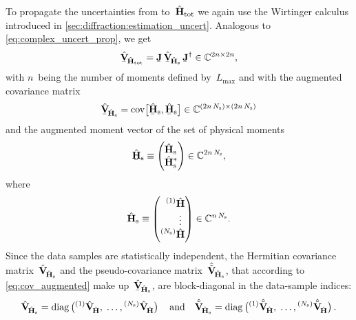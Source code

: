 To propagate the uncertainties from
to~$\hat{\bm{\mathrm{H}}}_\text{tot}$ we again use the Wirtinger calculus
introduced in \cref{sec:diffraction:estimation_uncert}.  Analogous to
\cref{eq:complex_uncert_prop}, we get
\begin{equation}
  \label{eq:photoprod_data_sample_complex_uncert_prop}
  \underaccent{\bar}{\hat{\covMatSym}}_{\!\hat{\vect{H}}_\text{tot}}
  = \underaccent{\bar}{\mat{J}}\, \underaccent{\bar}{\hat{\covMatSym}}_{\!\hat{\vect{H}}_\text{s}}\, \underaccent{\bar}{\mat{J}}^\dagger
  \in \mathbb{C}^{2n \times 2n},
\end{equation}
with $n$~being the number of moments defined by~$L_\text{max}$ and
with the augmented covariance matrix
\begin{equation}
  \underaccent{\bar}{\hat{\covMatSym}}_{\!\hat{\vect{H}}_\text{s}}
  = \cov[1]{\underaccent{\bar}{\hat{\vect{H}}}_\text{s}, \underaccent{\bar}{\hat{\vect{H}}}_\text{s}}
  \in \mathbb{C}^{(2n\, N_\text{s}) \times (2n\, N_\text{s})}
\end{equation}
and the augmented moment vector of the set
 of physical
moments
\begin{equation}
  \underaccent{\bar}{\hat{\vect{H}}}_\text{s}
  \equiv \begin{pmatrix*}[l]
    \hat{\vect{H}}_\text{s} \\
    \hat{\vect{H}}_\text{s}^*
  \end{pmatrix*}
  \in \mathbb{C}^{2n\, N_\text{s}},
\end{equation}
where
\begin{equation}
  \hat{\vect{H}}_\text{s}
  \equiv \begin{pmatrix*}[r]
    \prescript{(1)}{}{\vphantom{\vect{H}}}\hat{\vect{H}} \\
    \vdots~ \\
    \prescript{(N_\text{s})}{}{\vphantom{\vect{H}}}\hat{\vect{H}}
  \end{pmatrix*}
  \in \mathbb{C}^{n\, N_\text{s}}.
\end{equation}
Since the data samples are statistically independent, the Hermitian
covariance matrix~$\hat{\bm{\mathrm{V}}}_{\!\hat{\bm{\mathrm{H}}}_\text{s}}$ and
the pseudo-covariance
matrix~$\hat{\tilde{\bm{\mathrm{V}}}}_{\!\hat{\bm{\mathrm{H}}}_\text{s}}$, that
according to \cref{eq:cov_augmented} make
up~$\underaccent{\bar}{\hat{\covMatSym}}_{\!\hat{\vect{H}}_\text{s}}$,
are block-diagonal in the data-sample indices:
\begin{equation}
  \label{eq:photoprod_data_sample_cov_mats}
  \hat{\covMatSym}_{\!\hat{\vect{H}}_\text{s}}
  = \diag\rBrk[1]{\prescript{(1)}{}{\vphantom{\vect{H}}}\hat{\covMatSym}_{\!\hat{\vect{H}}},\;
  \ldots,
  \prescript{(N_\text{s})}{}{\vphantom{\vect{H}}}\hat{\covMatSym}_{\!\hat{\vect{H}}}}
  \quad\text{and}\quad
  \hat{\tilde{\covMatSym}}_{\!\hat{\vect{H}}_\text{s}}
  = \diag\rBrk[1]{\prescript{(1)}{}{\vphantom{\vect{H}}}\hat{\tilde{\covMatSym}}_{\!\hat{\vect{H}}},\;
  \ldots,
  \prescript{(N_\text{s})}{}{\vphantom{\vect{H}}}\hat{\tilde{\covMatSym}}_{\!\hat{\vect{H}}}}.
\end{equation}
